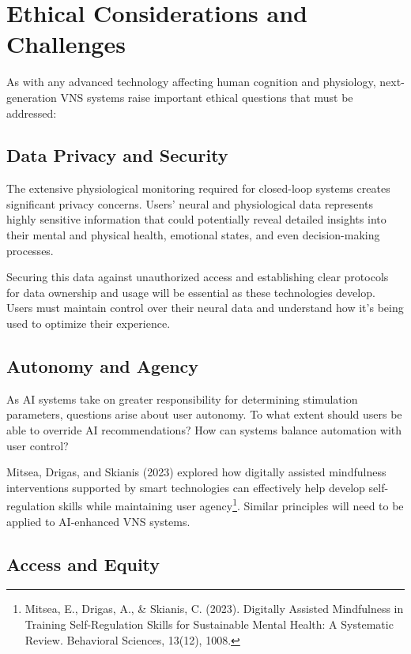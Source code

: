\documentclass[
  Letterpaper,
]{scrbook}
\begin{document}
\section{Ethical Considerations and
Challenges}\label{ethical-considerations-and-challenges}

As with any advanced technology affecting human cognition and
physiology, next-generation VNS systems raise important ethical
questions that must be addressed:

\subsection{Data Privacy and Security}\label{data-privacy-and-security}

The extensive physiological monitoring required for closed-loop systems
creates significant privacy concerns. Users' neural and physiological
data represents highly sensitive information that could potentially
reveal detailed insights into their mental and physical health,
emotional states, and even decision-making processes.

Securing this data against unauthorized access and establishing clear
protocols for data ownership and usage will be essential as these
technologies develop. Users must maintain control over their neural data
and understand how it's being used to optimize their experience.

\subsection{Autonomy and Agency}\label{autonomy-and-agency}

As AI systems take on greater responsibility for determining stimulation
parameters, questions arise about user autonomy. To what extent should
users be able to override AI recommendations? How can systems balance
automation with user control?

Mitsea, Drigas, and Skianis (2023) explored how digitally assisted
mindfulness interventions supported by smart technologies can
effectively help develop self-regulation skills while maintaining user
agency\footnote{Mitsea, E., Drigas, A., \& Skianis, C. (2023). Digitally
  Assisted Mindfulness in Training Self-Regulation Skills for
  Sustainable Mental Health: A Systematic Review. Behavioral Sciences,
  13(12), 1008.}. Similar principles will need to be applied to
AI-enhanced VNS systems.

\subsection{Access and Equity}\label{access-and-equity}
\end{document}
